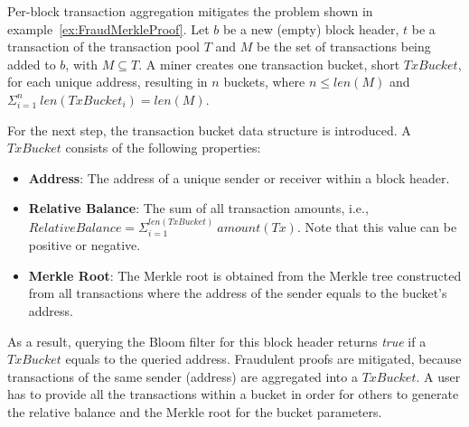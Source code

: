 \documentclass[conference]{IEEEtran}
\begin{document}
Per-block transaction aggregation mitigates the problem shown in example~\ref{ex:FraudMerkleProof}. Let $b$ be a new (empty) block header, $t$ be a transaction of the transaction pool $T$ and $M$ be the set of transactions being added to $b$, with $M \subseteq T$. A miner creates one transaction bucket, short $TxBucket$, for each unique address, resulting in $n$ buckets, where $n \leq len(M)$ and $\Sigma^n_{i = 1}\ len(TxBucket_i) = len(M)$. 

For the next step, the transaction bucket data structure is introduced. A $TxBucket$ consists of the following properties: 
\begin{itemize}
	\item \textbf{Address}: The address of a unique sender or receiver within a block header.
	\item \textbf{Relative Balance}: The sum of all transaction amounts, i.e., $RelativeBalance = \Sigma^{len(TxBucket)}_{i = 1}\ amount(Tx)$. Note that this value can be positive or negative.
	\item \textbf{Merkle Root}: The Merkle root is obtained from the Merkle tree constructed from all transactions where the address of the sender equals to the bucket's address.
\end{itemize}

As a result, querying the Bloom filter for this block header returns \textit{true} if a $TxBucket$ equals to the queried address. Fraudulent proofs are mitigated, because transactions of the same sender (address) are aggregated into a $TxBucket$. A user has to provide all the transactions within a bucket in order for others to generate the relative balance and the Merkle root for the bucket parameters.
\end{document}
